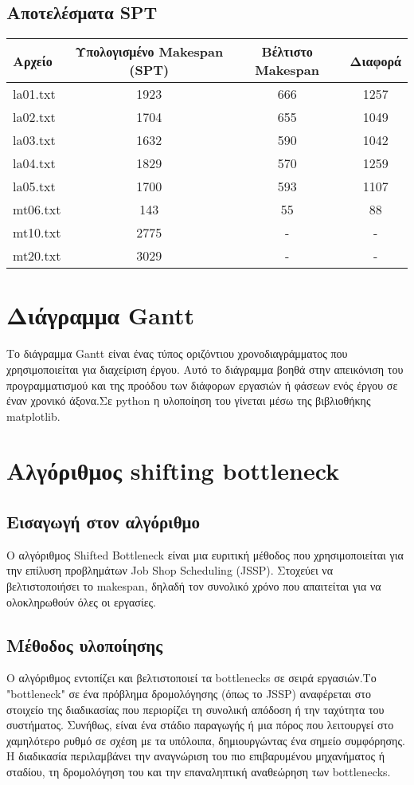 \documentclass{article}
\begin{document}
\subsection{Αποτελέσματα SPT}

\begin{tabular}{ l c c c }
\hline
Αρχείο & Υπολογισμένο Makespan (SPT) & Βέλτιστο Makespan & Διαφορά \\
\hline
la01.txt & 1923 & 666 & 1257 \\
la02.txt & 1704 & 655 & 1049 \\
la03.txt & 1632 & 590 & 1042 \\
la04.txt & 1829 & 570 & 1259 \\
la05.txt & 1700 & 593 & 1107 \\
mt06.txt & 143 & 55 & 88 \\
mt10.txt & 2775 & - & - \\
mt20.txt & 3029 & - & - \\
\hline
\end{tabular}



\section{Διάγραμμα Gantt}

Το διάγραμμα Gantt είναι ένας τύπος οριζόντιου χρονοδιαγράμματος που χρησιμοποιείται για διαχείριση έργου. Αυτό το διάγραμμα βοηθά στην απεικόνιση του προγραμματισμού και της προόδου των διάφορων εργασιών ή φάσεων ενός έργου σε έναν χρονικό άξονα.Σε python η υλοποίηση του γίνεται μέσω της βιβλιοθήκης matplotlib.



\section{Αλγόριθμος shifting bottleneck}
\vspace{0.2cm}

\subsection{Εισαγωγή στον αλγόριθμο}
Ο αλγόριθμος Shifted Bottleneck είναι μια ευριτική μέθοδος που χρησιμοποιείται για την επίλυση προβλημάτων Job Shop Scheduling (JSSP). Στοχεύει να βελτιστοποιήσει το makespan, δηλαδή τον συνολικό χρόνο που απαιτείται για να ολοκληρωθούν όλες οι εργασίες.

\subsection{Μέθοδος υλοποίησης}
Ο αλγόριθμος εντοπίζει και βελτιστοποιεί τα bottlenecks σε σειρά εργασιών.Το "bottleneck" σε ένα πρόβλημα δρομολόγησης (όπως το JSSP) αναφέρεται στο στοιχείο της διαδικασίας που περιορίζει τη συνολική απόδοση ή την ταχύτητα του συστήματος. Συνήθως, είναι ένα στάδιο παραγωγής ή μια πόρος που λειτουργεί στο χαμηλότερο ρυθμό σε σχέση με τα υπόλοιπα, δημιουργώντας ένα σημείο συμφόρησης. Η διαδικασία περιλαμβάνει την αναγνώριση του πιο επιβαρυμένου μηχανήματος ή σταδίου, τη δρομολόγηση του και την επαναληπτική αναθεώρηση των bottlenecks.
\end{document}
